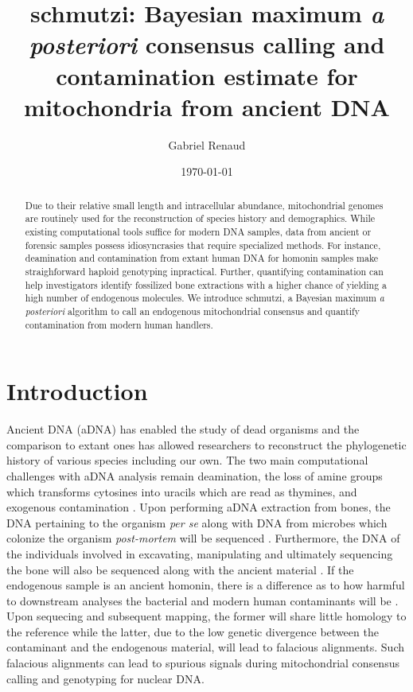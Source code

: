 \documentclass[a4paper,12pt]{article}
\begin{document}
\title{schmutzi: Bayesian maximum {\it a posteriori} consensus calling and contamination estimate for mitochondria from ancient DNA }
\date{\today}
\author{Gabriel Renaud}

\maketitle

\tableofcontents
\begin{abstract}
Due to their relative small length and intracellular abundance, mitochondrial genomes are routinely used for the reconstruction of species history and demographics. While existing computational tools suffice for modern DNA samples, data from ancient or forensic samples possess idiosyncrasies that require specialized methods. For instance, deamination and contamination from extant human DNA for homonin samples make straighforward haploid genotyping inpractical. Further, quantifying contamination can help investigators identify fossilized  bone extractions with a higher chance of yielding a high number of endogenous molecules. We introduce schmutzi, a Bayesian maximum {\it a posteriori} algorithm to call an endogenous mitochondrial consensus and quantify contamination from modern human handlers. 
\end{abstract}

\section{Introduction}

Ancient DNA (aDNA) has enabled the study of dead organisms and the comparison to extant ones has allowed researchers to reconstruct the phylogenetic history of various species including our own. The two main computational challenges with aDNA analysis remain deamination, the loss of amine groups which transforms cytosines into uracils which are read as thymines, and exogenous contamination \cite{briggs2007patterns}. Upon performing aDNA extraction from bones, the DNA pertaining to the organism {\it per se} along with DNA from microbes which colonize the organism {\it post-mortem} will be sequenced \cite{sidow1991bacterial,handt1994ancient}. Furthermore, the DNA of the individuals involved in excavating, manipulating and ultimately sequencing the bone will also be sequenced along with the ancient material \cite{Bandelt HJ. Mosaics of ancient mitochondrial DNA: positive indicators of nonauthenticity. Eur J Hum Genet. 2005; 13(10): 1106-1112.}. If the endogenous sample is an ancient homonin, there is a difference as to how harmful to downstream analyses the bacterial and modern human contaminants will be . Upon sequecing and subsequent mapping, the former will share little homology to the reference while the latter, due to the low genetic divergence between the contaminant and the endogenous material, will lead to falacious alignments. Such falacious alignments can lead to spurious signals during mitochondrial consensus calling and genotyping for nuclear DNA. 
\end{document}
